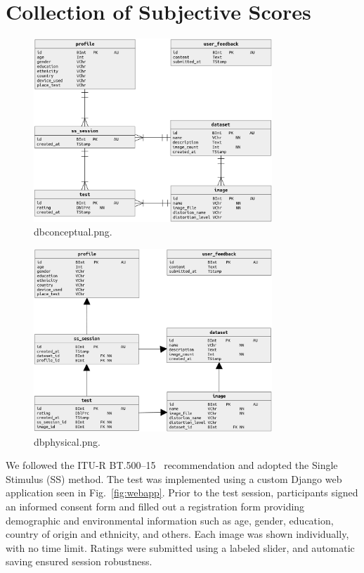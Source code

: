 \section{Collection of Subjective Scores}

\begin{figure}
    \centering
    \includegraphics[width=0.8\textwidth]{images/db_conceptual.png}
    \caption{dbconceptual.png.}\label{fig:db_conceptual}
\end{figure}

\begin{figure}
    \centering
    \includegraphics[width=0.8\textwidth]{images/db_physical.png}
    \caption{dbphysical.png.}\label{fig:db_physical}
\end{figure}

We followed the ITU-R BT.500--15~\cite{ITU-R-BT500} recommendation and adopted the Single Stimulus (SS) method. The test was implemented using a custom Django web application seen in Fig.~\ref{fig:webapp}. Prior to the test session, participants signed an informed consent form and filled out a registration form providing demographic and environmental information such as age, gender, education, country of origin and ethnicity, and others. Each image was shown individually, with no time limit. Ratings were submitted using a labeled slider, and automatic saving ensured session robustness.

